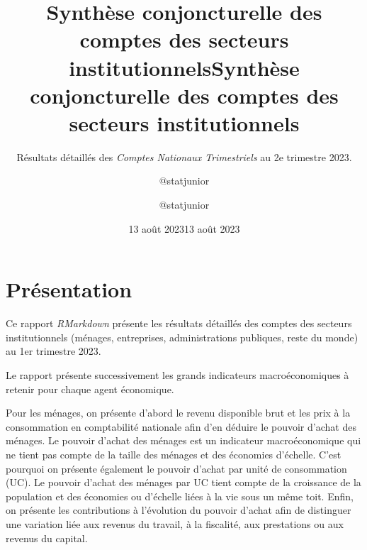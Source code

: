 \documentclass[
  paper=a4,
  ,captions=tableheading
]{scrartcl}
\title{Synthèse conjoncturelle des comptes des secteurs institutionnels}
\subtitle{Résultats détaillés des \emph{Comptes Nationaux Trimestriels}
au 2e trimestre 2023.}
\author{@statjunior}
\date{13 août 2023}
\title{Synthèse conjoncturelle des comptes des secteurs institutionnels}
\author{@statjunior}
\date{13 août 2023}
\begin{document}
\begin{titlepage}
\afterpage{\restorepagecolor}
\newcommand{\colorRule}[3][black]{\textcolor[HTML]{#1}{\rule{#2}{#3}}}
\end{titlepage}
\restoregeometry
{} 




\hypertarget{pruxe9sentation}{%
\section{Présentation}\label{pruxe9sentation}}

Ce rapport \emph{RMarkdown} présente les résultats détaillés des comptes
des secteurs institutionnels (ménages, entreprises, administrations
publiques, reste du monde) au 1er trimestre 2023.

Le rapport présente successivement les grands indicateurs
macroéconomiques à retenir pour chaque agent économique.

Pour les ménages, on présente d'abord le revenu disponible brut et les
prix à la consommation en comptabilité nationale afin d'en déduire le
pouvoir d'achat des ménages. Le pouvoir d'achat des ménages est un
indicateur macroéconomique qui ne tient pas compte de la taille des
ménages et des économies d'échelle. C'est pourquoi on présente également
le pouvoir d'achat par unité de consommation (UC). Le pouvoir d'achat
des ménages par UC tient compte de la croissance de la population et des
économies ou d'échelle liées à la vie sous un même toit. Enfin, on
présente les contributions à l'évolution du pouvoir d'achat afin de
distinguer une variation liée aux revenus du travail, à la fiscalité,
aux prestations ou aux revenus du capital.
\end{document}
